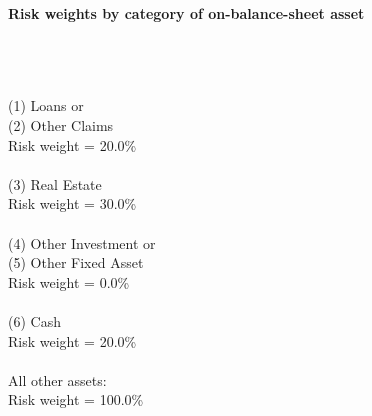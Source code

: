 \documentclass{article}
\begin{document}
\setlength{\parindent}{0em}
\begin{center}{\bf Risk weights by category of on-balance-sheet asset}\end{center}
~\\
~\\

~\\
(1) Loans or \\
(2) Other Claims \\
Risk weight = 20.0\%\\

~\\
(3) Real Estate \\
Risk weight = 30.0\%\\

~\\
(4) Other Investment or \\
(5) Other Fixed Asset \\
Risk weight = 0.0\%\\

~\\
(6) Cash \\
Risk weight = 20.0\%\\

~\\
All other assets:\\
Risk weight = 100.0\%\\

~\\
\end{document}

